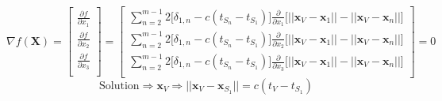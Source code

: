 \documentclass[11pt]{article}
\theoremstyle{definition}
\newcommand{\1}[1]{\mathbf{1} \left \{ #1 \right \}}
\begin{document}
\[\nabla f(\textbf{X}) = \begin{bmatrix}
\frac{\partial f}{\partial x_1} \\
\frac{\partial f}{\partial x_2} \\
\frac{\partial f}{\partial x_3} \\
\end{bmatrix} = \begin{bmatrix}
\sum_{n=2}^{m-1} 2\big[\delta_{1,n} - c(t_{S_n} - t_{S_1})\big] \frac{\partial}{\partial x_1} \big[||\textbf{x}_V - \textbf{x}_1|| - ||\textbf{x}_V - \textbf{x}_n||\big] \\
\sum_{n=2}^{m-1} 2\big[\delta_{1,n} - c(t_{S_n} - t_{S_1})\big] \frac{\partial}{\partial x_2} \big[||\textbf{x}_V - \textbf{x}_1|| - ||\textbf{x}_V - \textbf{x}_n||\big] \\
\sum_{n=2}^{m-1} 2\big[\delta_{1,n} - c(t_{S_n} - t_{S_1})\big] \frac{\partial}{\partial x_3} \big[||\textbf{x}_V - \textbf{x}_1|| - ||\textbf{x}_V - \textbf{x}_n||\big] \\
\end{bmatrix} = \textbf{$0$}\]
\[\text{Solution} \Rightarrow \textbf{x}_V \Rightarrow ||\textbf{x}_V - \textbf{x}_{S_1}|| = c(t_V - t_{S_1})\]
\end{document}
